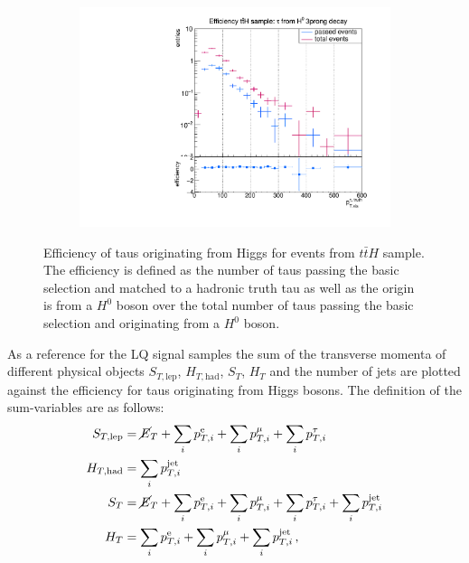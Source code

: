 \begin{figure}
\begin{subfigure}[t]{0.49\textwidth}
                \label{DividedFromH:bg:1prong}
                \end{subfigure}
                \begin{subfigure}[t]{0.49\textwidth}
                \includegraphics[width=\textwidth]{figures/plots/ttH/Divided_fromH3prong.pdf}
                \label{DividedFromH:bg:3prong}
                \end{subfigure}
\caption[Efficiency of taus originating from Higgs bosons for events from $t\bar{t}H$ sample.]{Efficiency of taus originating from Higgs for events from $t\bar{t}H$ sample. The efficiency is defined as the number of taus passing the basic selection and matched to a hadronic truth tau as well as the origin is from a $H^0$ boson over the total number of taus passing the basic selection and originating from a $H^0$ boson.}
\label{DividedFromH:bg:ttH}
\end{figure}
%
As a reference for the LQ signal samples the sum of the transverse momenta of different physical objects $S_{T,\text{lep}}$, $H_{T,\text{had}}$, $S_{T}$, $H_{T}$ and the number of jets are plotted against the efficiency for taus originating from Higgs bosons. The definition of the sum-variables are as follows:
\begin{align}
S_{T,\text{lep}}&=\cancel{E}_{T}+\sum_i p_{T,i}^{\text{e}}+\sum_i p_{T,i}^{\mu}+\sum_i p_{T,i}^{\tau} \label{STlepgedöns}\\
H_{T,\text{had}}&=\sum_i p_{T,i}^{\text{jet}} \label{HThadgedöns}\\
S_{T}&=\cancel{E}_{T}+\sum_i p_{T,i}^{\text{e}}+\sum_i p_{T,i}^{\mu}+\sum_i p_{T,i}^{\tau}+\sum_i p_{T,i}^{\text{jet}} \label{STgedöns}\\
H_{T}&=\sum_i p_{T,i}^{\text{e}}+\sum_i p_{T,i}^{\mu}+\sum_i p_{T,i}^{\text{jet}}\,\text{,}
\label{HTgedöns}
\end{align}
